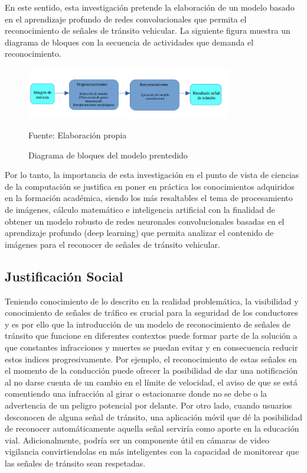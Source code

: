 	En este sentido, esta investigación pretende la elaboración de un modelo basado en el aprendizaje profundo de redes convolucionales que permita el reconocimiento de señales de tránsito vehicular. La siguiente figura muestra un diagrama de bloques con la secuencia de actividades que demanda el reconocimiento.

	\begin{figure}[H]
	\begin{center}
	\includegraphics[width=0.8\textwidth]{images/intro/bloque}
	\end{center}
	\begin{center}
	\caption{\small{Diagrama de bloques del modelo prentedido}}
	{\small{Fuente: Elaboración propia}}
	\end{center}
	\vspace{-1.5em}
	\end{figure}


	Por lo tanto, la importancia de esta investigación en el punto de vista de ciencias de la computación se justifica en poner en práctica los conocimientos adquiridos en la formación académica, siendo los más resaltables el tema de procesamiento de imágenes, cálculo matemático e inteligencia artificial con la finalidad de obtener un modelo robusto de redes neuronales convolucionales basadas en el aprendizaje profundo (deep learning) que permita analizar el contenido de imágenes para el reconocer de señales de tránsito vehicular. 


	\subsection{Justificación Social}
	
	Teniendo conocimiento de lo descrito en la realidad problemática, la visibilidad y conocimiento de señales de tráfico es crucial para la seguridad de los conductores y es por ello que la introducción de un modelo de reconocimiento de señales de tránsito que funcione en diferentes contextos puede formar parte de la solución a que constantes infracciones y muertes se puedan evitar y en consecuencia reducir estos indices progresivamente. Por ejemplo, el reconocimiento de estas señales en el momento de la conducción puede ofrecer la posibilidad de dar una notificación al no darse cuenta de un cambio en el límite de velocidad, el aviso de que se está comentiendo una infracción al girar o estacionarse donde no se debe o la advertencia de un peligro potencial por delante. Por otro lado, cuando usuarios desconocen de alguna señal de tránsito, una aplicación móvil que dé la posibilidad de reconocer automáticamente aquella señal serviría como aporte en la educación vial. Adicionalmente, podría ser un componente útil en cámaras de video vigilancia convirtiendolas en más inteligentes con la capacidad de monitorear que las señales de tránsito sean respetadas.\vskip 0.2cm

